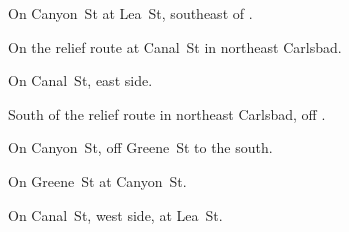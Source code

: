 
\begin{LocationList}

On Canyon~St at Lea~St, southeast of .

\Location{\GasStation \Gas}
On the relief route at Canal~St in northeast Carlsbad.

On  Canal~St, east side.

South of the relief route in northeast Carlsbad, off .

\Location{\RecruitmentAgency \Recruitment}
On Canyon~St, off  Greene~St to the south.

On  Greene~St at Canyon~St.

\Location{\TruckWash \Rest}
On   Canal~St, west side, at Lea~St.

\end{LocationList}
